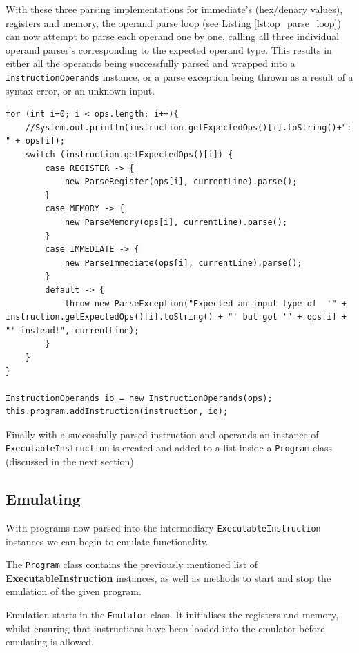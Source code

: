 With these three parsing implementations for immediate's (hex/denary values), registers and memory, the operand parse loop (see Listing \ref{lst:op_parse_loop}) can now attempt to parse each operand one by one, calling all three individual operand parser's corresponding to the expected operand type. This results in either all the operands being successfully parsed and wrapped into a \texttt{InstructionOperands} instance, or a parse exception being thrown as a result of a syntax error, or an unknown input.

\begin{lstlisting}[caption=Operand parse loop, label=lst:op_parse_loop]
for (int i=0; i < ops.length; i++){
    //System.out.println(instruction.getExpectedOps()[i].toString()+": " + ops[i]);
    switch (instruction.getExpectedOps()[i]) {
        case REGISTER -> {
            new ParseRegister(ops[i], currentLine).parse();
        }
        case MEMORY -> {
            new ParseMemory(ops[i], currentLine).parse();
        }
        case IMMEDIATE -> {
            new ParseImmediate(ops[i], currentLine).parse();
        }
        default -> {
            throw new ParseException("Expected an input type of  '" + instruction.getExpectedOps()[i].toString() + "' but got '" + ops[i] + "' instead!", currentLine);
        }
    }
}

InstructionOperands io = new InstructionOperands(ops);
this.program.addInstruction(instruction, io);
\end{lstlisting}

Finally with a successfully parsed instruction and operands an instance of \texttt{ExecutableInstruction} is created and added to a list inside a \texttt{Program} class (discussed in the next section).

\subsection{Emulating}
With programs now parsed into the intermediary \texttt{ExecutableInstruction} instances we can begin to emulate functionality.

The \texttt{Program} class contains the previously mentioned list of \textbf{ExecutableInstruction} instances, as well as methods to start and stop the emulation of the given program. 

Emulation starts in the \texttt{Emulator} class. It initialises the registers and memory, whilst ensuring that instructions have been loaded into the emulator before emulating is allowed.

